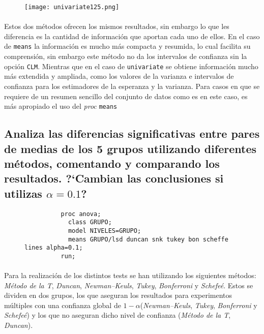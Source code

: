\documentclass{article}
\begin{document}
      \begin{figure}[H]
        \centering
        \texttt{[image: univariate125.png]}
      \end{figure}

      \paragraph{}
      Estos dos métodos ofrecen los mismos resultados, sin embargo lo que les diferencia es la cantidad de información que aportan cada uno de ellos. En el caso de \texttt{means} la información es mucho más compacta y resumida, lo cual facilita su comprensión, sin embargo este método no da los intervalos de confianza sin la opción \texttt{CLM}. Mientras que en el caso de \texttt{univariate} se obtiene información mucho más extendida y ampliada, como los valores de la varianza e intervalos de confianza para los estimadores de la esperanza y la varianza. Para casos en que se requiere de un resumen sencillo del conjunto de datos como es en este caso, es más apropiado el uso del \emph{proc} \texttt{means}

    \subsection{Analiza las diferencias significativas entre pares de medias de los 5 grupos utilizando diferentes métodos, comentando y comparando los resultados. ?`Cambian las conclusiones si utilizas $\alpha = 0.1$?}

      \begin{figure}[h]
        \centering
        \begin{verbatim}
          proc anova;
            class GRUPO;
            model NIVELES=GRUPO;
            means GRUPO/lsd duncan snk tukey bon scheffe lines alpha=0.1;
          run;
        \end{verbatim}
        \label{code:sas_5}
      \end{figure}

      \paragraph{}
      Para la realización de los distintos tests se han utilizando los siguientes métodos: \emph{Método de la T}, \emph{Duncan}, \emph{Newman–Keuls}, \emph{Tukey}, \emph{Bonferroni} y \emph{Schefeé}. Estos se dividen en dos grupos, los que aseguran los resultados para experimentos múltiples con una confianza global de $1-\alpha$(\emph{Newman–Keuls}, \emph{Tukey}, \emph{Bonferroni} y \emph{Schefeé}) y los que no aseguran dicho nivel de confianza (\emph{Método de la T}, \emph{Duncan}).
\end{document}
